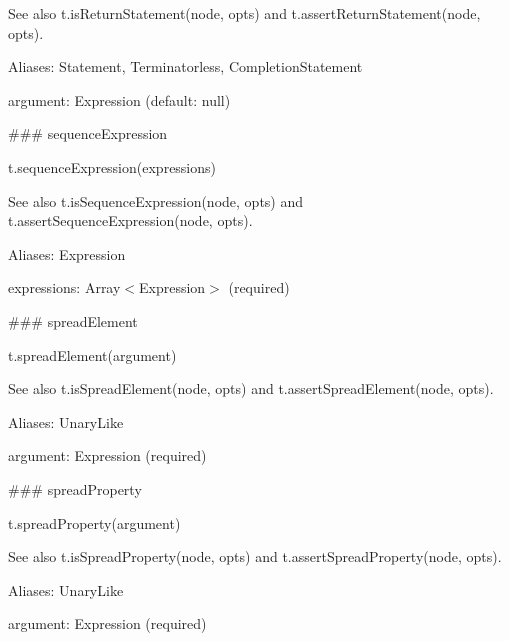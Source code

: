 See also {\ttfamily t.\+is\+Return\+Statement(node, opts)} and {\ttfamily t.\+assert\+Return\+Statement(node, opts)}.

Aliases\+: {\ttfamily Statement}, {\ttfamily Terminatorless}, {\ttfamily Completion\+Statement}


\begin{DoxyItemize}
\item {\ttfamily argument}\+: {\ttfamily Expression} (default\+: {\ttfamily null}) 


\end{DoxyItemize}

\#\#\# sequence\+Expression 
\begin{DoxyCode}
t.sequenceExpression(expressions)
\end{DoxyCode}


See also {\ttfamily t.\+is\+Sequence\+Expression(node, opts)} and {\ttfamily t.\+assert\+Sequence\+Expression(node, opts)}.

Aliases\+: {\ttfamily Expression}


\begin{DoxyItemize}
\item {\ttfamily expressions}\+: {\ttfamily Array$<$Expression$>$} (required) 


\end{DoxyItemize}

\#\#\# spread\+Element 
\begin{DoxyCode}
t.spreadElement(argument)
\end{DoxyCode}


See also {\ttfamily t.\+is\+Spread\+Element(node, opts)} and {\ttfamily t.\+assert\+Spread\+Element(node, opts)}.

Aliases\+: {\ttfamily Unary\+Like}


\begin{DoxyItemize}
\item {\ttfamily argument}\+: {\ttfamily Expression} (required) 


\end{DoxyItemize}

\#\#\# spread\+Property 
\begin{DoxyCode}
t.spreadProperty(argument)
\end{DoxyCode}


See also {\ttfamily t.\+is\+Spread\+Property(node, opts)} and {\ttfamily t.\+assert\+Spread\+Property(node, opts)}.

Aliases\+: {\ttfamily Unary\+Like}


\begin{DoxyItemize}
\item {\ttfamily argument}\+: {\ttfamily Expression} (required) 


\end{DoxyItemize}

